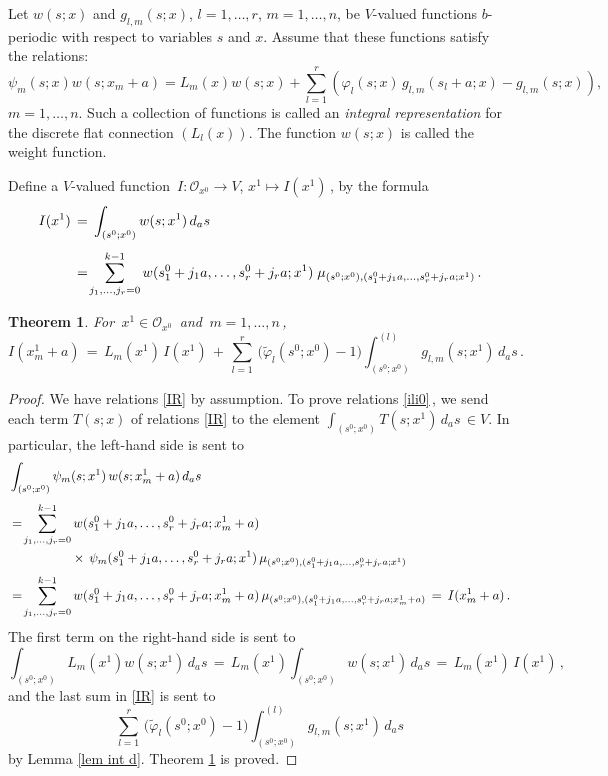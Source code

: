 \documentclass[12pt]{amsart}
\newtheorem{thm}{Theorem}[section]
\theoremstyle{definition} %
\numberwithin{equation}{section}
\theoremstyle{definition}
\let\mc\mathcal
\let\phi\varphi
\def\beq{\begin{equation}}
\def\eeq{\end{equation}}
\def\be{\begin{equation*}}
\def\ee{\end{equation*}}
\begin{document}
Let $w(s;x)$ and $g_{l,m}(s;x)$, $l=1, \dots, r$, $m=1,\dots,n$, be $V$-valued functions
$b$-periodic with respect to variables $s$ and $x$. Assume that these functions satisfy the relations:
\beq
\label{IR}
\psi_m(s;x) w(s;x_m+a) = L_m(x)w(s;x) +
\sum_{l=1}^r \left(\phi_l(s;x)\,g_{l,m}(s_l+a;x) -g_{l,m}(s;x)\right),
\eeq
$m=1,\dots,n$. Such a collection of functions is called an {\it integral
representation} for the discrete flat connection $(L_l(x))$. The function
$w(s;x)$ is called the weight function.

\smallskip
Define a $V$-valued function \,$I : \mc O_{x^0}\to V$, \;$x^1 \mapsto I(x^1)$\,,
by the formula
\begin{align}
\label{ix1}
I(x^1)\,&{}=\, \int_{(s^0;x^0)} w(s;x^1)\, d_a s
\\[4pt]
\notag
&{}=\!\sum_{j_1, \dots, j_r=0}^{k-1}
w(s_1^0+j_1a, \dots, s_r^0+j_ra; x^1)\;\mu_{(s^0; x^0),(s_1^0 + j_1a,
\dots, s_r^0 + j_ra; x^1)}\,.
\end{align}

\begin{thm}
\label{thm sol0}
For \,$x^1\in \mc O_{x^0}$ \,and \,$m=1,\dots, n$\,,
\beq
\label{ili0}
I(x^1_m+a)\,=\,L_m(x^1)\,I(x^1)\,+\,\sum_{l=1}^r\,
\bigl(\tilde\phi_l(s^0;x^0)-1\bigr)\int^{(l)}_{(s^0; x^0)} g_{l,m}(s;x^1)\, d_a s\,.
\eeq
\end{thm}
\begin{proof}
We have relations \eqref{IR} by assumption. To prove relations \eqref{ili0}\,,
we send each term $T(s;x)$ of relations \eqref{IR} to the element
$\int_{(s^0;x^0)}T(s;x^1)\,d_a s\,\in V$. In particular, the left-hand side is sent to
\begin{align*}
& \int_{(s^0;x^0)} \psi_m(s;x^1) \,w(s;x_m^1+a)\, d_a s
\\[3pt]
&{}=\!\sum_{j_1, \dots, j_r=0}^{k-1}w(s_1^0+j_1a, \dots, s_r^0+j_ra; x^1_m+a)
\\
&\hp{{}=\!\sum_{j_1, \dots, j_r=0}}
\times\,\psi_m(s_1^0+j_1a, \dots, s_r^0+j_ra; x^1)\,
\mu_{(s^0; x^0),(s_1^0 + j_1a,\dots,s_r^0 + j_ra; x^1)}
\\[2pt]
&{}=\!\sum_{j_1, \dots, j_r=0}^{k-1} w(s_1^0+j_1a, \dots, s_r^0+j_ra; x^1_m+a)\,
\mu_{(s^0; x^0),(s_1^0 + j_1a,\dots, s_r^0 + j_ra; x_m^1+a)}\,=\,I(x_m^1+a)\,.
\end{align*}
The first term on the right-hand side is sent to
\be
\int_{(s^0;x^0)} L_m(x^1)w(s;x^1)\,d_as\,=\,
L_m(x^1)\int_{(s^0;x^0)} w(s;x^1)\,d_a s\,=\,L_m(x^1)\,I(x^1)\,,
\ee
and the last sum in \eqref{IR} is sent to
\be
\sum_{l=1}^r\,\bigl(\tilde\phi_l(s^0;x^0)-1\bigr)
\int^{(l)}_{(s^0; x^0)} g_{l,m}(s;x^1)\, d_a s
\ee
by Lemma \ref{lem int d}. Theorem \ref{thm sol0} is proved.
\end{proof}
\end{document}
